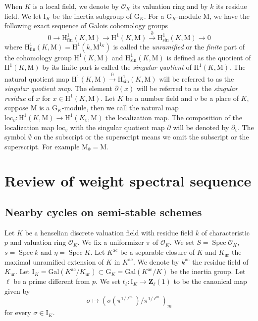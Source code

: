 \documentclass[10pt]{amsart}
\newcommand*\Z{\mathds{Z}}
\newcommand*\ZZ{|[draw,circle]| \Z_2}
\numberwithin{equation}{section}
\theoremstyle{plain}
\numberwithin{equation}{section}
\theoremstyle{definition}
\theoremstyle{remark}
\def\Gal{\mathrm{Gal}}
\def\sing{\mathrm{sin}}
\def\ac{\mathrm{ac}}
\def\ur{\mathrm{ur}}
\def\ac{\mathrm{ac}}
\DeclareMathOperator{\Spec}{Spec}
\def\calO{\mathcal{O}}
\def\ZZ{\mathbf{Z}}
\def\rmG{\mathrm{G}}
\def\rmH{\mathrm{H}}
\def\rmI{\mathrm{I}}
\def\rmM{\mathrm{M}}
\begin{document}
When $K$ is a local field, we denote by $\calO_{K}$ its valuation ring  and by $k$ its residue field. We let $\rmI_{K}$ be the inertia subgroup of $\rmG_{K}$. For a $\rmG_{K}$-module $\rmM$,  we have the following exact sequence of Galois cohomology groups
\begin{equation}\label{fin-sing}
0\rightarrow \rmH^{1}_{\mathrm{fin}}(K, \rmM)\rightarrow \rmH^{1}(K, \rmM)\xrightarrow{\partial} \rmH^{1}_{\sing}(K, \rmM)\rightarrow 0  
\end{equation}
where  $\rmH^{1}_{\mathrm{fin}}(K, \rmM)=\rmH^{1}(k, \rmM^{\rmI_{K}})$
is called the \emph{unramified} or the \emph{finite} part of the cohomology group $\rmH^{1}(K, \rmM)$ and $\rmH^{1}_{\mathrm{sin}}(K, \rmM)$ is defined as the quotient of $\rmH^{1}(K, \rmM)$ by its finite part is called the \emph{singular quotient} of  $\rmH^{1}(K, \rmM)$. The natural quotient map $\rmH^{1}(K, \rmM)\xrightarrow{\partial} \rmH^{1}_{\sing}(K, \rmM)$ will be referred to as the \emph{singular quotient map}. The element $\partial(x)$ will be referred to as the \emph{singular residue} of $x$ for  $x\in \rmH^{1}(K, \rmM)$. Let $K$ be a number field and $v$ be a place of $K$, suppose $\rmM$ is a $\rmG_{K}$-module, then we call the natural map $\mathrm{loc}_{v}: \rmH^{1}(K, \rmM)\rightarrow \rmH^{1}(K_{v}, \rmM)$ the localization map. The composition of the localization map $\mathrm{loc}_{v}$ with the singular quotient map $\partial$ will be denoted by $\partial_{v}$. The symbol ${\emptyset}$ on the subscript or the superscript means we omit the subscript or the superscript. For example $\rmM_{\emptyset}=\rmM$.

\section{Review of weight spectral sequence}
\subsection{Nearby cycles on semi-stable schemes} Let $K$ be a henselian discrete valuation field with residue field $k$ of characteristic $p$ and valuation ring $\calO_{K}$. We fix a uniformizer $\pi$ of $\calO_{K}$. We set $S=\Spec\calO_{K}$, $s=\Spec k$ and $\eta=\Spec K$. Let $K^{\ac}$ be a separable closure of $K$ and $K_{\ur}$ the maximal unramified extension of $K$ in $K^{\ac}$. We denote by $k^{\ac}$ the residue field of $K_{\ur}$. 
Let $\rmI_{K}=\Gal(K^{\ac}/K_{\ur})\subset \rmG_{K}=\Gal(K^{\ac}/K)$ be the inertia group. Let $\ell$ be a prime different from $p$. We set $t_{\ell}: \rmI_{K}\rightarrow \ZZ_{\ell}(1)$ to be the canonical map given by 
\begin{equation*}
\sigma \mapsto (\sigma(\pi^{1/\ell^{m}})/\pi^{1/\ell^{m}})_{m}
\end{equation*} 
for every $\sigma\in \rmI_{K}$. 
\end{document}
